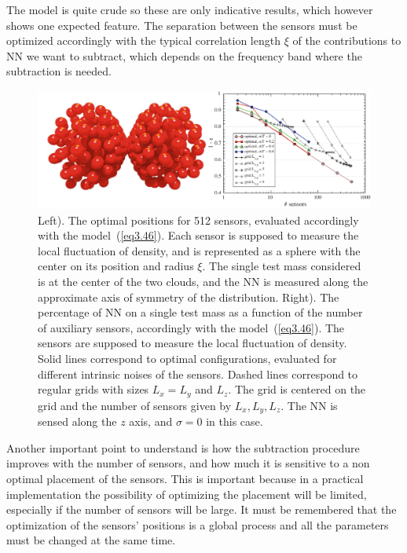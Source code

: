 The model is quite crude so these are only indicative results, which however shows one expected feature. The separation between the sensors must be optimized accordingly with the typical correlation length $\xi$ of the contributions to NN we want to subtract, which depends on the frequency band where the subtraction is needed. 	
\begin{figure}[t!]
	\begin{center}
		\includegraphics[width=16.5cm]{./Sec_SiteInfra/Figures/SimplOptSens2.pdf}
		\end{center}
		\caption{Left). The optimal positions for 512 sensors, evaluated accordingly with the model~(\ref{eq3.46}). Each sensor is supposed to measure the local fluctuation of density, and is represented as a sphere with the center on its position and radius $\xi$. The single test mass considered is at the center of the two clouds, and the NN is measured along the approximate axis of symmetry of the distribution. Right). The percentage of NN on a single test mass as a function of the number of auxiliary sensors, accordingly with the model~(\ref{eq3.46}). The sensors are supposed to measure the local fluctuation of density. Solid lines correspond to optimal configurations, evaluated for different intrinsic noises of the sensors. Dashed lines correspond to regular grids with sizes $L_{x}=L_{y}$ and $L_{z}$. The grid is centered on the grid and the number of sensors given by $L_{x},L_{y},L_{z}$. The NN is sensed along the $z$ axis, and $\sigma=0$ in this case.}
\label{fig:OptimalPosition}
\end{figure}

Another important point to understand is how the subtraction procedure improves with the number of sensors, and how much it is sensitive to a non optimal placement of the sensors. This is important because in a practical implementation the possibility of optimizing the placement will be limited, especially if the number of sensors will be large. It must be remembered that the optimization of the sensors' positions is a global process and all the parameters must be changed at the same time. 

